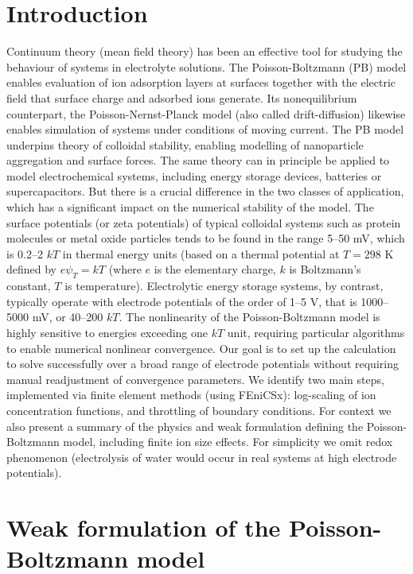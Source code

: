 \section*{Introduction}

Continuum theory (mean field theory) has been an effective tool for
studying the behaviour of systems in electrolyte solutions. The
Poisson-Boltzmann (PB) model \cite{Wu2022} enables evaluation of ion
adsorption layers at surfaces together with the electric field that
surface charge and adsorbed ions generate. Its nonequilibrium
counterpart, the Poisson-Nernst-Planck model
\cite{LopezGarciaHornoGrosse2018} (also called drift-diffusion)
likewise enables simulation of systems under conditions of moving
current. The PB model underpins theory of colloidal stability,
enabling modelling of nanoparticle aggregation and surface forces. The
same theory can in principle be applied to model electrochemical
systems, including energy storage devices, batteries or
supercapacitors. But there is a crucial difference in the two classes
of application, which has a significant impact on the numerical
stability of the model.  The surface potentials (or zeta potentials)
of typical colloidal systems such as protein molecules or metal oxide
particles tends to be found in the range 5--50 mV, which is 0.2--2
$kT$ in thermal energy units (based on a thermal potential at $T=298$
K defined by $e\psi_{T} = kT$ (where $e$ is the elementary charge, $k$
is Boltzmann's constant, $T$ is temperature). Electrolytic energy
storage systems, by contrast, typically operate with electrode
potentials of the order of 1--5 V, that is 1000--5000 mV, or 40--200
$kT$.  The nonlinearity of the Poisson-Boltzmann model is highly
sensitive to energies exceeding one $kT$ unit, requiring particular
algorithms to enable numerical nonlinear convergence.  Our goal is to
set up the calculation to solve successfully over a broad range of
electrode potentials without requiring manual readjustment of
convergence parameters.  We identify two main steps, implemented via
finite element methods (using FEniCSx\cite{baratta2023dolfinx}): log-scaling of
ion concentration functions, and throttling of boundary
conditions. For context we also present a summary of the physics and
weak formulation defining the Poisson-Boltzmann model, including
finite ion size effects. For simplicity we omit redox phenomenon
(electrolysis of water would occur in real systems at high electrode
potentials).

\section{Weak formulation of the Poisson-Boltzmann model}

